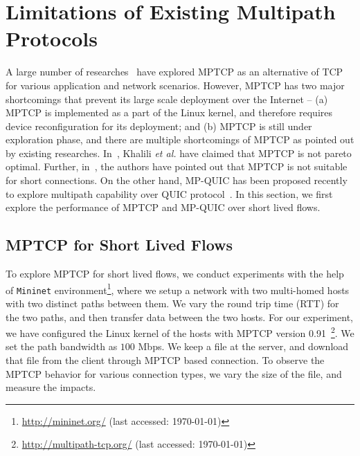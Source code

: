 \section{Limitations of Existing Multipath Protocols}
A large number of researches~\cite{oh2016feedback,barik2016lisa,khalili2013mptcp,kheirkhah2016mmptcp,kheirkhah2015short} have explored MPTCP as an alternative of TCP for various application and network scenarios. However, MPTCP has two major shortcomings that prevent its large scale deployment over the Internet -- (a) MPTCP is implemented as a part of the Linux kernel, and therefore requires device reconfiguration for its deployment; and (b) MPTCP is still under exploration phase, and there are multiple shortcomings of MPTCP as pointed out by existing researches. In~\cite{khalili2013mptcp}, Khalili \textit{et al.} have claimed that MPTCP is not pareto optimal. Further, in~\cite{kheirkhah2016mmptcp}, the authors have pointed out that MPTCP is not suitable for short connections. On the other hand, MP-QUIC has been proposed recently to explore multipath capability over QUIC protocol~\cite{mpquic-measure}.
In this section, we first explore the performance of MPTCP and MP-QUIC over short lived flows. 

\subsection{MPTCP for Short Lived Flows} 
To explore MPTCP for short lived flows, we conduct experiments with the help of \texttt{Mininet} environment\footnote{\url{http://mininet.org/} (last accessed: \today)}, where we setup a network with two multi-homed hosts with two distinct paths between them. We vary the round trip time (RTT) for the two paths, and then transfer data between the two hosts. For our experiment, we have configured the Linux kernel of the hosts with MPTCP version 0.91~\footnote{\url{http://multipath-tcp.org/} (last accessed: \today)}. We set the path bandwidth as $100$ Mbps. 
We keep a file at the server, and download that file from the client through MPTCP based connection. To observe the MPTCP behavior for various connection types, we vary the size of the file, and measure the impacts.

